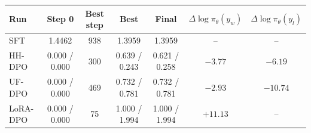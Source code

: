 \begin{tabular}{l c c c c c c}
\toprule
Run & Step 0 & Best step & Best & Final & $\Delta\log\pi_\theta(y_w)$ & $\Delta\log\pi_\theta(y_l)$ \\
\midrule
SFT & 1.4462 & 938 & 1.3959 & 1.3959 & -- & -- \\
HH-DPO & 0.000 / 0.000 & 300 & 0.639 / 0.243 & 0.621 / 0.258 & $-3.77$ & $-6.19$ \\
UF-DPO & 0.000 / 0.000 & 469 & 0.732 / 0.781 & 0.732 / 0.781 & $-2.93$ & $-10.74$ \\
LoRA-DPO & 0.000 / 0.000 & 75 & 1.000 / 1.994 & 1.000 / 1.994 & $+11.13$ & -- \\
\bottomrule
\end{tabular}
